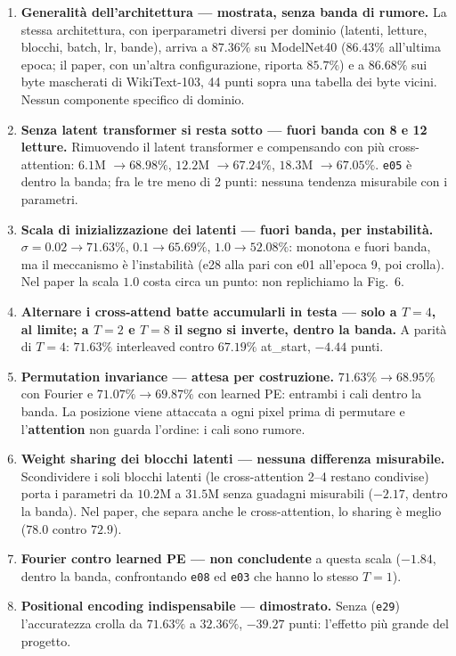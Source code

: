 \documentclass[
  11pt,
]{article}
\begin{document}
\begin{enumerate}
\item \textbf{Generalità dell'architettura --- mostrata, senza banda di rumore.} La stessa architettura, con iperparametri diversi per dominio (latenti, letture, blocchi, batch, lr, bande), arriva a $87.36\%$ su ModelNet40 ($86.43\%$ all'ultima epoca; il paper, con un'altra configurazione, riporta $85.7\%$) e a $86.68\%$ sui byte mascherati di WikiText-103, 44 punti sopra una tabella dei byte vicini. Nessun componente specifico di dominio.
\item \textbf{Senza latent transformer si resta sotto --- fuori banda con 8 e 12 letture.} Rimuovendo il latent transformer e compensando con più cross-attention: $6.1$M $\to 68.98\%$, $12.2$M $\to 67.24\%$, $18.3$M $\to 67.05\%$. \texttt{e05} è dentro la banda; fra le tre meno di 2 punti: nessuna tendenza misurabile con i parametri.
\item \textbf{Scala di inizializzazione dei latenti --- fuori banda, per instabilità.} $\sigma = 0.02 \to 71.63\%$, $0.1 \to 65.69\%$, $1.0 \to 52.08\%$: monotona e fuori banda, ma il meccanismo è l'instabilità (e28 alla pari con e01 all'epoca 9, poi crolla). Nel paper la scala $1.0$ costa circa un punto: non replichiamo la Fig.~6.
\item \textbf{Alternare i cross-attend batte accumularli in testa --- solo a $T=4$, al limite; a $T=2$ e $T=8$ il segno si inverte, dentro la banda.} A parità di $T=4$: $71.63\%$ interleaved contro $67.19\%$ at\_start, $-4.44$ punti.
\item \textbf{Permutation invariance --- attesa per costruzione.} $71.63\% \to 68.95\%$ con Fourier e $71.07\% \to 69.87\%$ con learned PE: entrambi i cali dentro la banda. La posizione viene attaccata a ogni pixel prima di permutare e l'\textbf{attention} non guarda l'ordine: i cali sono rumore.
\item \textbf{Weight sharing dei blocchi latenti --- nessuna differenza misurabile.} Scondividere i soli blocchi latenti (le cross-attention 2--4 restano condivise) porta i parametri da $10.2$M a $31.5$M senza guadagni misurabili ($-2.17$, dentro la banda). Nel paper, che separa anche le cross-attention, lo sharing è meglio ($78.0$ contro $72.9$).
\item \textbf{Fourier contro learned PE --- non concludente} a questa scala ($-1.84$, dentro la banda, confrontando \texttt{e08} ed \texttt{e03} che hanno lo stesso $T=1$).
\item \textbf{Positional encoding indispensabile --- dimostrato.} Senza (\texttt{e29}) l'accuratezza crolla da $71.63\%$ a $32.36\%$, $-39.27$ punti: l'effetto più grande del progetto.

\end{enumerate}
\end{document}
